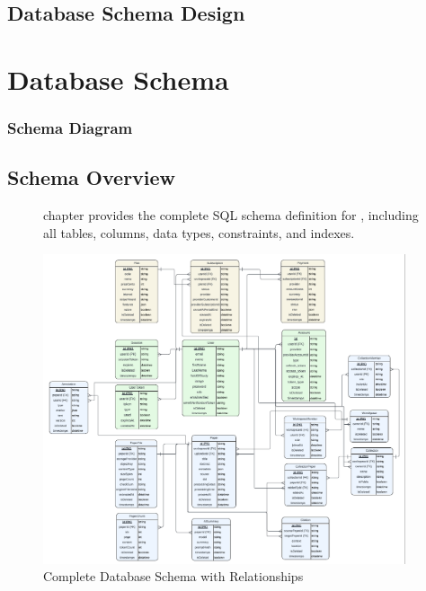 \section{Database Schema Design}\chapter{Database Schema}

\label{sec:schema}\label{ch:database-schema}



\subsection{Schema Diagram}\section{Schema Overview}

\label{sec:schema-overview}

\begin{figure}[H]

\centeringThis chapter provides the complete SQL schema definition for \projectname{}, including all tables, columns, data types, constraints, and indexes.

\includegraphics[width=0.95\textwidth]{images/diagrams/schema.png}

\caption{Complete Database Schema with Relationships}%

\label{fig:schema}%

\end{figure}%

